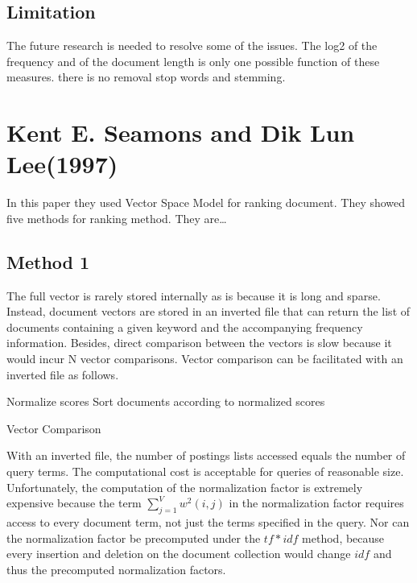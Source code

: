 \subsection{Limitation}

The future research is needed to resolve some of the issues. The log2 of the frequency and of the document length is only one possible function of these measures. there is no removal stop words and stemming.

\section{Kent E. Seamons and Dik Lun Lee(1997)}

In this paper they used Vector Space Model for ranking document. They showed five methods for ranking method. They are…

\subsection{Method 1}

The full vector is rarely stored internally as is because it is long and sparse. Instead, document vectors are stored in an inverted file that can return the list of documents containing a given keyword and the accompanying frequency information. Besides, direct comparison between the vectors is slow because it would incur N vector comparisons. Vector comparison can be facilitated with an inverted file as follows.


\begin{algorithm}[H]


Normalize scores\;
Sort documents according to normalized scores\;

\caption{Vector Comparison}

\end{algorithm}


With an inverted file, the number of postings lists accessed equals the number of query terms. The computational cost is acceptable for queries of reasonable size. Unfortunately, the computation of the normalization factor is extremely expensive because the term \(\sum_{j=1}^{V}w^2(i,j)\) in the normalization factor requires access to every document term, not just the terms specified in the query. Nor can the normalization factor be precomputed under the \(tf *idf\)  method, because every insertion and deletion on the document collection would change $idf$ and thus the precomputed normalization factors.

